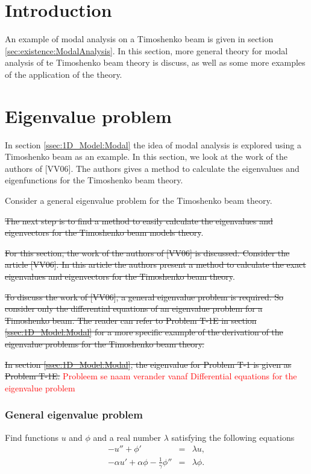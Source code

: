 \documentclass[../../main.tex]{subfiles}
\begin{document}
\section{Introduction}
An example of modal analysis on a Timoshenko beam is given in section \ref{sec:existence:ModalAnalysis}. In this section, more general theory for modal analysis of te Timoshenko beam theory is discuss, as well as some more examples of the application of the theory.
\section{Eigenvalue problem}\label{sec:Timo:EigenvalueProblem}
In section \ref{ssec:1D_Model:Modal} the idea of modal analysis is explored using a Timoshenko beam as an example. In this section, we look at the work of the authors of [VV06]. The authors gives a method to calculate the eigenvalues and eigenfunctions for the Timoshenko beam theory.

Consider a general eigenvalue problem for the Timoshenko beam theory.

\sout{The next step is to find a method to {easily} calculate the eigenvalues and eigenvectors for the Timoshenko beam models {theory}}.

\sout{For this section, the work of the authors of [VV06] is discussed. {Consider the article [VV06].} In this article the authors present a method to calculate the exact eigenvalues and eigenvectors for the Timoshenko beam theory}.

\sout{To discuss the work of [VV06], a general eigenvalue problem is required. So consider only the differential equations of an eigenvalue problem for a Timoshenko beam. The reader can refer to Problem T-1E in section \ref{ssec:1D_Model:Modal} for a more specific example of the derivation of the eigenvalue problems for the Timoshenko beam theory.}

\sout{In section \ref{ssec:1D_Model:Modal}, the eigenvalue for Problem T-1 is given as Problem T-1E. }
\textcolor{red}{Probleem se naam verander vanaf Differential equations for the eigenvalue problem}
\subsubsection{General eigenvalue problem} \label{sssec:Timo:EigenvalueProblem}
Find functions $u$ and $\phi$ and a real number $\lambda$ satisfying the following equations
\begin{eqnarray}
-u'' + \phi' &=& \lambda u, \label{eq:Timo:EigenvalueProblem1}\\
-\alpha u' + \alpha\phi - \frac{1}{\gamma}\phi'' &=& \lambda\phi.\label{eq:Timo:EigenvalueProblem2}
\end{eqnarray}
\end{document}
